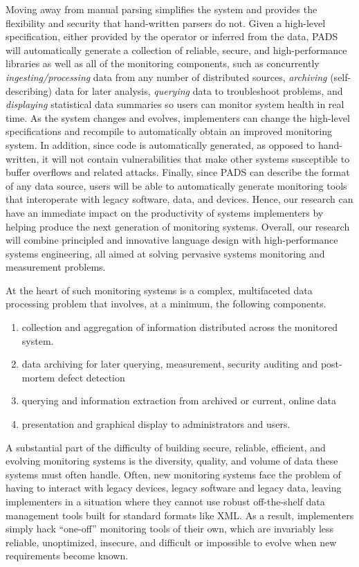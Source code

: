 Moving away from manual parsing simplifies the system and provides the
flexibility and security that hand-written parsers do not.  Given a
high-level specification, either provided by the operator or inferred
from the data, PADS will automatically generate a collection of
reliable, secure, and high-performance libraries as well as all of the
monitoring components, such as concurrently {\em ingesting/processing}
data from any number of distributed sources, {\em archiving}
(self-describing) data for later analysis, {\em querying} data to
troubleshoot problems, and {\em displaying} statistical data summaries
so users can monitor system health in real time.  As the system
changes and evolves, implementers can change the high-level
specifications and recompile to automatically obtain an improved
monitoring system.  In addition, since code is automatically
generated, as opposed to hand-written, it will not contain
vulnerabilities that make other systems susceptible to buffer
overflows and related attacks.  Finally, since PADS can describe the
format of any data source, users will be able to automatically
generate monitoring tools that interoperate with legacy software,
data, and devices.  Hence, our research can have an
immediate impact on the productivity of systems implementers by
helping produce the next generation of monitoring systems.  Overall,
our research will combine principled and innovative language design
with high-performance systems engineering, all aimed at solving
pervasive systems monitoring and measurement problems.



At the heart of such monitoring systems is a complex, multifaceted
data processing problem that involves, at a minimum, the following components.
\begin{enumerate}
\item collection and aggregation of information 
distributed across the monitored system.
\item data archiving for later querying, measurement, security auditing and 
post-mortem defect detection
\item querying and information extraction from archived or current, online data
\item presentation and graphical display to administrators and users.
\end{enumerate}

A substantial part of the difficulty of building secure, reliable, efficient,
and evolving monitoring systems is the diversity, quality, and volume of data
these systems must often handle.  Often, new monitoring
systems face the problem of having to interact with legacy devices,
legacy software and legacy data, leaving implementers in a situation
where they cannot use robust off-the-shelf data management tools built for
standard formats like XML.  As a result, implementers simply
hack ``one-off'' monitoring tools of their own, which are invariably
less reliable, unoptimized, insecure, and difficult or impossible to evolve
when new requirements become known.

